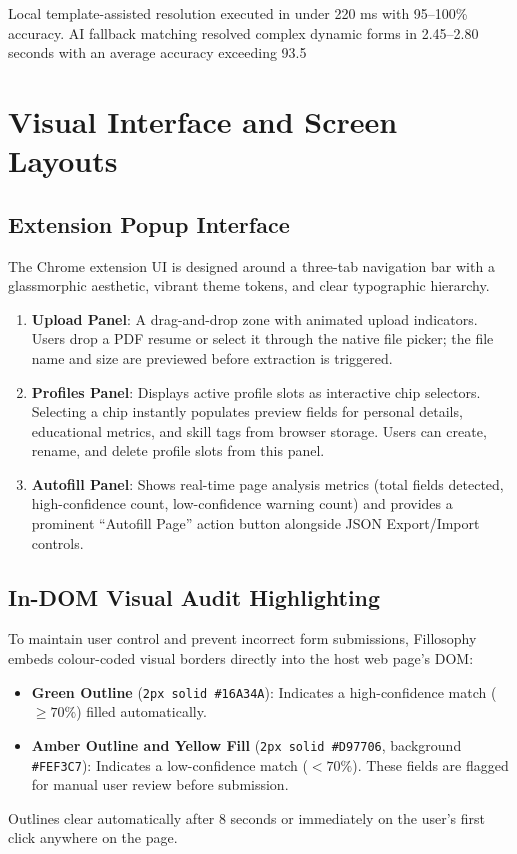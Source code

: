\documentclass[12pt,a4paper]{report}
\begin{document}
Local template-assisted resolution executed in under 220 ms with 95–100\% accuracy. AI fallback matching resolved complex dynamic forms in 2.45–2.80 seconds with an average accuracy exceeding 93.5%

\chapter{Visual Interface and Screen Layouts}

\section{Extension Popup Interface}
The Chrome extension UI is designed around a three-tab navigation bar with a glassmorphic aesthetic, vibrant theme tokens, and clear typographic hierarchy.

\begin{enumerate}
    \item \textbf{Upload Panel}: A drag-and-drop zone with animated upload indicators. Users drop a PDF resume or select it through the native file picker; the file name and size are previewed before extraction is triggered.
    \item \textbf{Profiles Panel}: Displays active profile slots as interactive chip selectors. Selecting a chip instantly populates preview fields for personal details, educational metrics, and skill tags from browser storage. Users can create, rename, and delete profile slots from this panel.
    \item \textbf{Autofill Panel}: Shows real-time page analysis metrics (total fields detected, high-confidence count, low-confidence warning count) and provides a prominent ``Autofill Page'' action button alongside JSON Export/Import controls.
\end{enumerate}

\section{In-DOM Visual Audit Highlighting}
To maintain user control and prevent incorrect form submissions, Fillosophy embeds colour-coded visual borders directly into the host web page's DOM:
\begin{itemize}
    \item \textbf{Green Outline} (\texttt{2px solid \#16A34A}): Indicates a high-confidence match ($\geq 70\%$) filled automatically.
    \item \textbf{Amber Outline and Yellow Fill} (\texttt{2px solid \#D97706}, background \texttt{\#FEF3C7}): Indicates a low-confidence match ($< 70\%$). These fields are flagged for manual user review before submission.
\end{itemize}
Outlines clear automatically after 8 seconds or immediately on the user's first click anywhere on the page.
\end{document}
